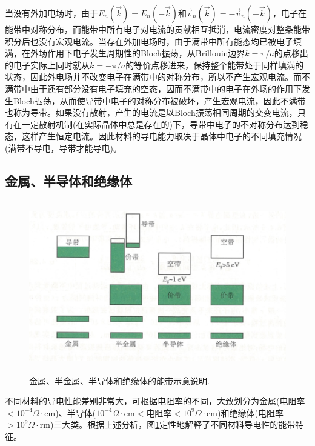 当没有外加电场时，由于$E_n(\vec k)=E_n(-\vec k)$和$\vec v_n(\vec k)=-\vec v_n(-\vec k)$，电子在能带中对称分布，而能带中所有电子对电流的贡献相互抵消，电流密度对整条能带积分后也没有宏观电流。当存在外加电场时，由于满带中所有能态均已被电子填满，在外场作用下电子发生周期性的Bloch振荡，从Brillouin边界$k=\pi/a$的点移出的电子实际上同时就从$k=-\pi/a$的等价点移进来，保持整个能带处于同样填满的状态，因此外电场并不改变电子在满带中的对称分布，所以不产生宏观电流。而不满带中由于还有部分没有电子填充的空态，因而不满带中的电子在外场的作用下发生Bloch振荡，从而使导带中电子的对称分布被破坏，产生宏观电流，因此不满带也称为导带。如果没有散射，产生的电流是以Bloch振荡相同周期的交变电流，只有在一定散射机制(在实际晶体中总是存在的)下，导带中电子的不对称分布达到稳态，这样产生恒定电流。因此材料的导电能力取决于晶体中电子的不同填充情况(满带不导电，导带才能导电)。

\subsection{金属、半导体和绝缘体} 
\begin{figure}[h!]
\centering
\vspace*{-0.10in}
\includegraphics[height=2.95in,width=4.50in,viewport=0 0 85 55,clip]{Figures/Band_Gap.png}
\caption{\small \textrm{金属、半金属、半导体和绝缘体的能带示意说明.}}%
\label{Fig:Band_Gap}
\end{figure}
不同材料的导电性能差别非常大，可根据电阻率的不同，大致划分为金属(电阻率$<10^{-4}\Omega\cdot\mathrm{cm}$)、半导体($10^{-4}\Omega\cdot\mathrm{cm}<$电阻率$<10^9\Omega\cdot\mathrm{cm}$)和绝缘体(电阻率$>10^{9}\Omega\cdot\mathrm{rm}$)三大类。根据上述分析，图\ref{Fig:Band_Gap}定性地解释了不同材料导电性的能带特征。

